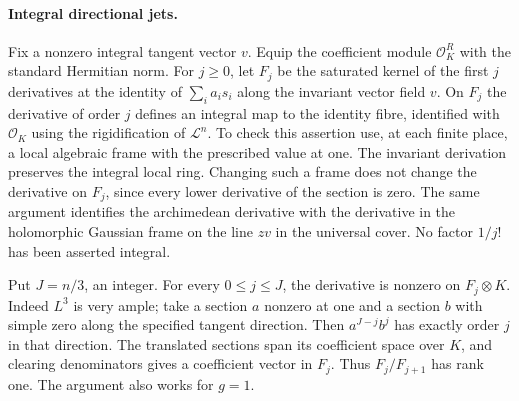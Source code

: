 \paragraph{Integral directional jets.}
Fix a nonzero integral tangent vector \(v\).
Equip the coefficient module \(\mathcal O_K^R\) with the standard
Hermitian norm. For \(j\ge0\), let \(F_j\) be the saturated kernel
of the first \(j\) derivatives at the identity of
\(\sum_i a_i s_i\) along the invariant vector field \(v\).
On \(F_j\) the derivative of order \(j\) defines an integral
map to the identity fibre, identified with \(\mathcal O_K\)
using the rigidification of \(\mathcal L^n\). To check this
assertion use, at each finite place, a local algebraic frame
with the prescribed value at one. The invariant derivation
preserves the integral local ring. Changing such a frame
does not change the derivative on \(F_j\), since every lower
derivative of the section is zero. The same argument identifies
the archimedean derivative with the derivative in the holomorphic
Gaussian frame on the line \(zv\) in the universal cover. No
factor \(1/j!\) has been asserted integral.

Put \(J=n/3\), an integer. For every \(0\le j\le J\), the
derivative is nonzero on \(F_j\otimes K\). Indeed \(L^3\) is
very ample; take a section \(a\) nonzero at one and a section
\(b\) with simple zero along the specified tangent direction.
Then \(a^{J-j}b^j\) has exactly order \(j\) in that
direction. The translated sections span its coefficient space
over \(K\), and clearing denominators gives a coefficient
vector in \(F_j\). Thus \(F_j/F_{j+1}\) has rank one.
The argument also works for \(g=1\).

